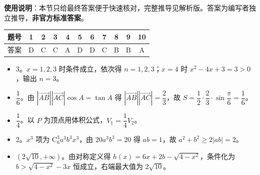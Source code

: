 
\begin{gknotice}
\textbf{使用说明}：本节只给最终答案便于快速核对，完整推导见解析版。答案为编写者独立推导，\textbf{非官方标准答案}。
\end{gknotice}

\begin{center}\begin{tabular}{ccccccccccc}
\toprule
题号 & 1 & 2 & 3 & 4 & 5 & 6 & 7 & 8 & 9 & 10 \\
\midrule
答案 & D & C & C & A & D & D & C & B & B & A \\
\bottomrule
\end{tabular}\end{center}

\begin{itemize}[leftmargin=2.6em]
  \item[\textbf{11.}] $3$。$x=1,2,3$ 时条件成立，依次得 $n=1,2,3$；$x=4$ 时 $x^2-4x+3=3>0$，输出 $n=3$。
  \item[\textbf{12.}] $\dfrac16$。由 $|\overrightarrow{AB}||\overrightarrow{AC}|\cos A=\tan A$ 得 $|\overrightarrow{AB}||\overrightarrow{AC}|=\dfrac23$，故 $S=\dfrac12\cdot\dfrac23\cdot\sin\dfrac\pi6=\dfrac16$。
  \item[\textbf{13.}] $\dfrac14$。以 $P$ 为顶点用体积公式，$V_1=\dfrac14V_2$。
  \item[\textbf{14.}] $2$。$x^3$ 项为 $\mathrm C_6^3a^3b^3x^3$，由 $20a^3b^3=20$ 得 $ab=1$，故 $a^2+b^2\geqslant2|ab|=2$。
  \item[\textbf{15.}] $(2\sqrt{10},+\infty)$。由对称定义得 $h(x)=6x+2b-\sqrt{4-x^2}$，条件化为 $b>\sqrt{4-x^2}-3x$ 恒成立，右端最大值为 $2\sqrt{10}$。
\end{itemize}

